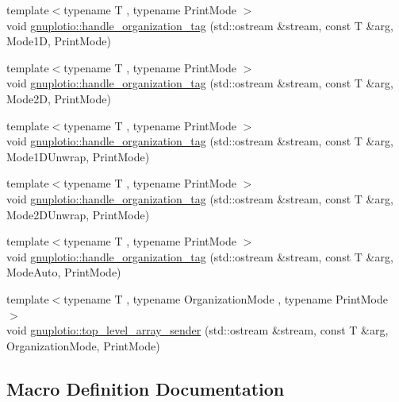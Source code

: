 \begin{DoxyCompactItemize}
\item 
{\footnotesize template$<$typename T , typename Print\+Mode $>$ }\\void \hyperlink{namespacegnuplotio_af809657552a53c3b17f0400a5c210a7f}{gnuplotio\+::handle\+\_\+organization\+\_\+tag} (std\+::ostream \&stream, const T \&arg, Mode1D, Print\+Mode)
\item 
{\footnotesize template$<$typename T , typename Print\+Mode $>$ }\\void \hyperlink{namespacegnuplotio_a1310221abf0551a805d4482f0612317b}{gnuplotio\+::handle\+\_\+organization\+\_\+tag} (std\+::ostream \&stream, const T \&arg, Mode2D, Print\+Mode)
\item 
{\footnotesize template$<$typename T , typename Print\+Mode $>$ }\\void \hyperlink{namespacegnuplotio_a99e6125b97bc2ca4241f6275d83f05d4}{gnuplotio\+::handle\+\_\+organization\+\_\+tag} (std\+::ostream \&stream, const T \&arg, Mode1\+D\+Unwrap, Print\+Mode)
\item 
{\footnotesize template$<$typename T , typename Print\+Mode $>$ }\\void \hyperlink{namespacegnuplotio_a9d2cee7a7f2ed9748a0f135b206836d3}{gnuplotio\+::handle\+\_\+organization\+\_\+tag} (std\+::ostream \&stream, const T \&arg, Mode2\+D\+Unwrap, Print\+Mode)
\item 
{\footnotesize template$<$typename T , typename Print\+Mode $>$ }\\void \hyperlink{namespacegnuplotio_affc9cb6a9b6e5630523f0dbf8acdfcc2}{gnuplotio\+::handle\+\_\+organization\+\_\+tag} (std\+::ostream \&stream, const T \&arg, Mode\+Auto, Print\+Mode)
\item 
{\footnotesize template$<$typename T , typename Organization\+Mode , typename Print\+Mode $>$ }\\void \hyperlink{namespacegnuplotio_a1e452d861932700749421ce103ef8d48}{gnuplotio\+::top\+\_\+level\+\_\+array\+\_\+sender} (std\+::ostream \&stream, const T \&arg, Organization\+Mode, Print\+Mode)
\end{DoxyCompactItemize}


\subsection{Macro Definition Documentation}
\mbox{\label{gnuplot-iostream_8h_afe4b1cc99e87d3bb8bbb07280db4b697}} 
